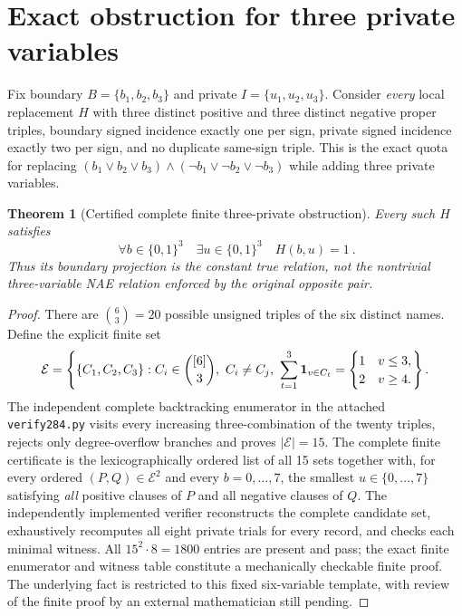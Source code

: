 \documentclass[11pt]{article}
\newtheorem{theorem}{Theorem}
\begin{document}
\section{Exact obstruction for three private variables}
Fix boundary $B=\{b_1,b_2,b_3\}$ and private $I=\{u_1,u_2,u_3\}$. Consider \emph{every} local replacement $H$ with three distinct positive and three distinct negative proper triples, boundary signed incidence exactly one per sign, private signed incidence exactly two per sign, and no duplicate same-sign triple. This is the exact quota for replacing $(b_1\vee b_2\vee b_3)\wedge(\neg b_1\vee\neg b_2\vee\neg b_3)$ while adding three private variables.
\begin{theorem}[Certified complete finite three-private obstruction]
Every such $H$ satisfies
\[
 \boxed{\ \forall b\in\{0,1\}^3\quad\exists u\in\{0,1\}^3\quad H(b,u)=1\ }.
\]
Thus its boundary projection is the constant true relation, \emph{not} the nontrivial three-variable NAE relation enforced by the original opposite pair.
\end{theorem}
\begin{proof}There are $\binom 63=20$ possible unsigned triples of the six distinct names. Define the explicit finite set
\[
 \mathcal E=\left\{\{C_1,C_2,C_3\}: C_i\in\binom{[6]}3,\ C_i\ne C_j,\ \sum_{t=1}^3{\bf 1}_{v\in C_t}=\begin{cases}1&v\le3,\\2&v\ge4.\end{cases}\right\}.
\]
The independent complete backtracking enumerator in the attached \texttt{verify284.py} visits every increasing three-combination of the twenty triples, rejects only degree-overflow branches and proves $|\mathcal E|=15$. The complete finite certificate is the lexicographically ordered list of all 15 sets together with, for every ordered $(P,Q)\in\mathcal E^2$ and every $b=0,\ldots,7$, the smallest $u\in\{0,\ldots,7\}$ satisfying \emph{all} positive clauses of $P$ and all negative clauses of $Q$. The independently implemented verifier reconstructs the complete candidate set, exhaustively recomputes all eight private trials for every record, and checks each minimal witness. All $15^2\cdot8=1800$ entries are present and pass; the exact finite enumerator and witness table constitute a mechanically checkable finite proof. The underlying fact is restricted to this fixed six-variable template, with review of the finite proof by an external mathematician still pending.\end{proof}
\end{document}
